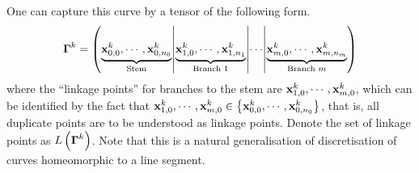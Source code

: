 \documentclass[../dissertation.tex]{subfiles}
\begin{document}
One can capture this curve by a tensor of the following form.
\begin{equation*}
    \boldsymbol{\Gamma}^k = \left( \underbrace{\mathbf{x}_{0,0}^k, \cdots, \mathbf{x}_{0,n_0}^k}_{\text{Stem}} \middle|
    \underbrace{\mathbf{x}_{1,0}^k, \cdots, \mathbf{x}_{1,n_1}^k}_{\text{Branch 1}}
\middle| \cdots \middle|
\underbrace{\mathbf{x}_{m,0}^k, \cdots, \mathbf{x}_{m,n_m}^k}_{\text{Branch } m}\right)
\end{equation*}
where the ``linkage points'' for branches to the stem are $\mathbf{x}_{1,0}^k, \cdots, \mathbf{x}_{m,0}^k$,
which can be identified by the fact that $\mathbf{x}_{1,0}^k, \cdots, \mathbf{x}_{m,0}^k \in \left\{ \mathbf{x}_{0,0}^k, \cdots, \mathbf{x}_{0, n_0}^k \right\}$,
that is, all duplicate points are to be understood as linkage points.
Denote the set of linkage points as $L \left( \boldsymbol{\Gamma}^k \right)$.
Note that this is a natural generalisation of discretisation of curves homeomorphic to a line segment.
\end{document}

